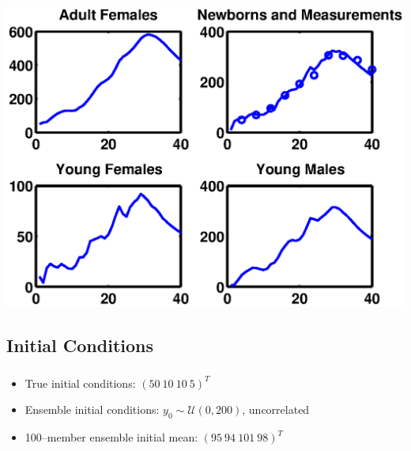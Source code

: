 \documentclass[mathserif]{beamer}
\begin{document}
\begin{frame}
\begin{center}
\frametitle{\insertsubsection}
\includegraphics[width=1\textwidth]{truth}
\end{center}
\end{frame}

\subsection{Initial Conditions}

\begin{frame}
\begin{center}
\frametitle{\insertsubsection}
\begin{itemize}
  \item True initial conditions: $(50\ 10\ 10\ 5)^T$
  \item Ensemble initial conditions: $y_0\sim\mathcal{U}(0,200)$, uncorrelated
  \item 100--member ensemble initial mean: $(95\ 94\ 101\ 98)^T$
\end{itemize}
\end{center}
\end{frame}
\end{document}
